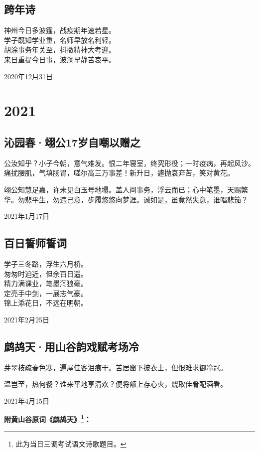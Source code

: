 \documentclass[a5paper]{ctexart}
\begin{document}
	\subsection{跨年诗}
	\begin{center}
		神州今日多波霆，战疫期年速若星。\\
		学子既知学业重，名师早放名利轻。\\
		胡涂事务年关至，抖擞精神大考迎。\\
		来日重提今日事，波澜早静苦哀平。
		
	\end{center}
	\hfill 2020年12月31日
	
	
	\newpage
	\section{2021}
	\subsection{沁园春·翊公17岁自嘲以赠之}
	公汝知乎？小子今朝，意气难发。恨二年寝室，终究形役；一时疫病，再起风沙。痛扰腰肌，气填肠胃，嗟尔高三万事差！新升日，遽抛哀弃苦，笑对黄花。
	
	翊公知慧足嘉，许未见白玉号地塌。盖人间事务，浮云而已；心中笔墨，天赐繁华。勿悲平生，勿违己意，步履悠悠向梦涯。诚如是，虽竟然失意，谁唱悲笳？
	\begin{flushright}
		2021年1月17日
	\end{flushright}
	
	\subsection{百日誓师誓词}
	\begin{center}
		学子三冬路，浮生六月桥。\\
		匆匆时迫近，但余百日遥。\\
		精力满课业，笔墨润狼毫。\\
		定亮手中剑，一展志气豪。\\
		锦上添花日，不远在明朝。
		
	\end{center}
	\hfill 2021年2月25日
	
	\subsection{鹧鸪天·用山谷韵戏赋考场冷}
	芽翠枝疏春色寒，遍屋佳客泪痕干。苦居窗下披衣士，但恨难求御冷冠。
	
	温岂至，热何餐？谁来平地享清欢？便将额上存心火，烧取佳肴配酒看。
	\begin{flushright}
		2021年4月15日
	\end{flushright}
	\begin{flushleft}
		\textbf{附黄山谷原词《鹧鸪天》\footnote{此为当日三调考试语文诗歌题目。}：}
	\end{flushleft}
	
\end{document}
